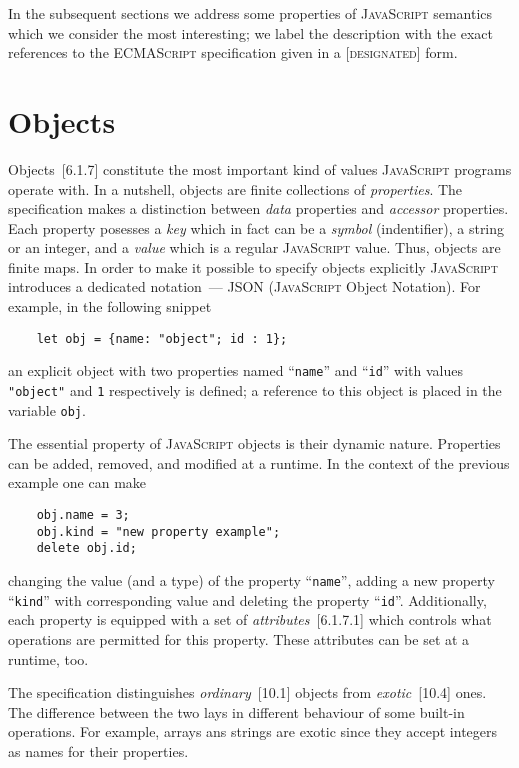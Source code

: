 \documentclass{article}
\newcommand{\js}{\textsc{JavaScript}\xspace}
\newcommand{\es}{\textsc{ECMAScript}\xspace}
\newcommand{\rf}[1]{[\textsc{#1}]}
\begin{document}
In the subsequent sections we address some properties of \js semantics which we consider the most interesting; we
label the description with the exact references to the \es specification given in a \rf{designated} form.

\section{Objects}
\label{sec:model}

Objects~\rf{6.1.7} constitute the most important kind of values \js programs operate with. In a nutshell, objects are
finite collections of \emph{properties}. The specification makes a distinction between \emph{data} properties and \emph{accessor}
properties. Each property posesses a \emph{key} which in fact can be a \emph{symbol}
(indentifier), a string or an integer, and a \emph{value} which is a regular \js value. Thus, objects are finite maps.
In order to make it possible to specify objects explicitly \js introduces a dedicated notation~--- JSON (\js Object Notation).
For example, in the following snippet

\begin{lstlisting}
    let obj = {name: "object"; id : 1};
\end{lstlisting}

an explicit object with two properties named ``\lstinline|name|'' and ``\lstinline|id|'' with values \lstinline|"object"| and
\lstinline|1| respectively is defined; a reference to this object is placed in the variable \lstinline|obj|.

The essential property of \js objects is their dynamic nature. Properties can be added, removed, and modified at a runtime.
In the context of the previous example one can make

\begin{lstlisting}
    obj.name = 3;
    obj.kind = "new property example";
    delete obj.id;
\end{lstlisting}

changing the value (and a type) of the property ``\lstinline|name|'', adding a new property ``\lstinline|kind|'' with
corresponding value and deleting the property ``\lstinline|id|''. Additionally, each property is equipped with a set
of \emph{attributes}~\rf{6.1.7.1} which controls what operations are permitted for this property. These attributes can
be set at a runtime, too. 

The specification distinguishes \emph{ordinary}~\rf{10.1} objects from \emph{exotic}~\rf{10.4} ones. The difference between the
two lays in different behaviour of some built-in operations. For example, arrays ans strings are exotic since they
accept integers as names for their properties.
\end{document}
